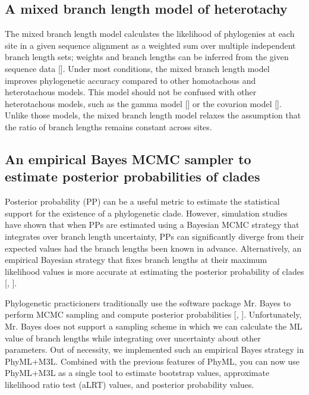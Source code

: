 \documentclass[11pt]{article}
\begin{document}
\bigskip

\subsection{A mixed branch length model of heterotachy}

The mixed branch length model calculates the likelihood of phylogenies at each site in a given sequence alignment as a weighted sum over multiple independent branch length sets; weights and branch lengths can be inferred from the given sequence data [\cite{kolaczkowski2008}].  Under most conditions, the mixed branch length model improves phylogenetic accuracy compared to other homotachous and heterotachous models.  This model should not be confused with other heterotachous models, such as the gamma model [\cite{Yang:1994vf}] or the covarion model [\cite{Penny:2001zv}].  Unlike those models, the mixed branch length model relaxes the assumption that the ratio of branch lengths remains constant across sites.

\subsection{An empirical Bayes MCMC sampler to estimate posterior probabilities of clades}

Posterior probability (PP) can be a useful metric to estimate the statistical support for the existence of a phylogenetic clade. However, simulation studies have shown that when PPs are estimated using a Bayesian MCMC strategy that integrates over branch length uncertainty, PPs can significantly diverge from their expected values had the branch lengths been known in advance. Alternatively, an empirical Bayesian strategy that fixes branch lengths at their maximum likelihood values is more accurate at estimating the posterior probability of clades  [\cite{kolaczkowski2007}, \cite{kolaczkowski2009}].

Phylogenetic practicioners traditionally use the software package Mr. Bayes to perform MCMC sampling and compute posterior probabilities [\cite{mrbayes}, \cite{huelsenbeck2003mrb}]. Unfortunately, Mr. Bayes does not support a sampling scheme in which we can calculate the ML value of branch lengths while integrating over uncertainty about other parameters. Out of necessity, we implemented such an empirical Bayes strategy in PhyML+M3L. Combined with the previous features of PhyML, you can now use PhyML+M3L as a single tool to estimate bootstrap values, approximate likelihood ratio test (aLRT) values, and posterior probability values. 
\end{document}
